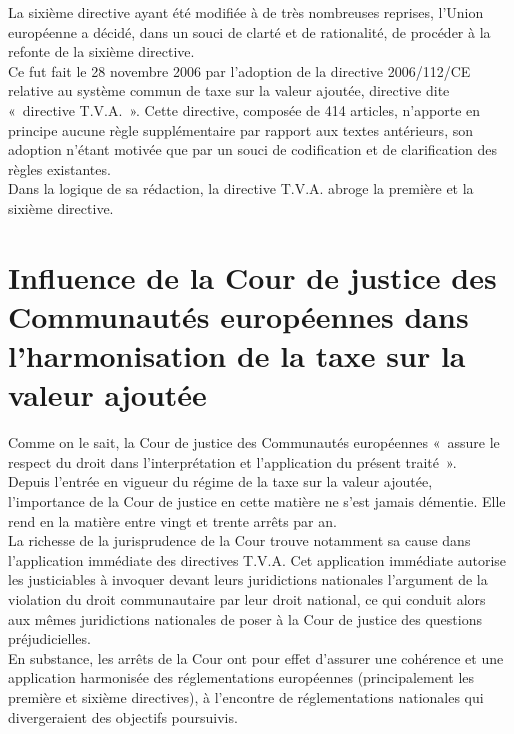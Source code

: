\documentclass{book}
\begin{document}
La sixième directive ayant été modifiée à de très nombreuses reprises, l’Union européenne a
décidé, dans un souci de clarté et de rationalité, de procéder à la refonte de la sixième
directive.\\

Ce fut fait le 28 novembre 2006 par l’adoption de la directive 2006/112/CE relative au
système commun de taxe sur la valeur ajoutée, directive dite «~directive T.V.A.~». Cette
directive, composée de 414 articles, n’apporte en principe aucune règle supplémentaire par
rapport aux textes antérieurs, son adoption n’étant motivée que par un souci de codification et
de clarification des règles existantes.\\

Dans la logique de sa rédaction, la directive T.V.A. abroge la première et la sixième directive.\\

\section{Influence de la Cour de justice des Communautés européennes dans l’harmonisation de la taxe sur la valeur ajoutée}

Comme on le sait, la Cour de justice des Communautés européennes «~assure le respect du
droit dans l’interprétation et l’application du présent traité~».\\

Depuis l’entrée en vigueur du régime de la taxe sur la valeur ajoutée, l’importance de la Cour
de justice en cette matière ne s’est jamais démentie. Elle rend en la matière entre vingt et
trente arrêts par an.\\

La richesse de la jurisprudence de la Cour trouve notamment sa cause dans l’application
immédiate des directives T.V.A. Cet application immédiate autorise les justiciables à
invoquer devant leurs juridictions nationales l’argument de la violation du droit
communautaire par leur droit national, ce qui conduit alors aux mêmes juridictions nationales
de poser à la Cour de justice des questions préjudicielles.\\

En substance, les arrêts de la Cour ont pour effet d’assurer une cohérence et une application
harmonisée des réglementations européennes (principalement les première et sixième
directives), à l’encontre de réglementations nationales qui divergeraient des objectifs
poursuivis.\\
\end{document}
